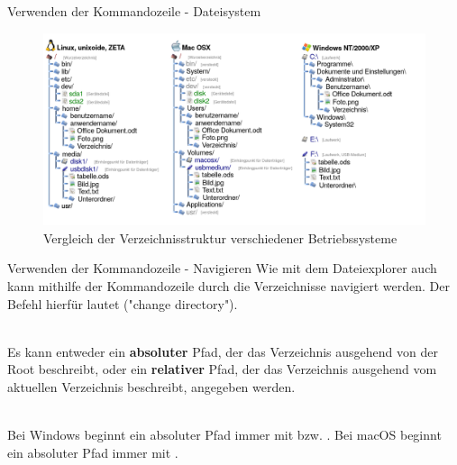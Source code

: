      \begin{frame}{Verwenden der Kommandozeile - Dateisystem}
       
       \begin{figure}
            \centering
            \includegraphics[width=\linewidth,height=0.7\textheight,keepaspectratio]{chapters/05_command_line/figures/Filesystem.png}
            \caption{Vergleich der Verzeichnisstruktur verschiedener Betriebssysteme \cite{filesystems}}
            \label{fig:file_system}
        \end{figure}
    \end{frame}
    
     \begin{frame}{Verwenden der Kommandozeile - Navigieren}
        Wie mit dem Dateiexplorer auch kann mithilfe der Kommandozeile durch die Verzeichnisse navigiert werden. Der Befehl hierfür lautet  ("change directory"). \\~\
        
        Es kann entweder ein \textbf{absoluter} Pfad, der das Verzeichnis ausgehend von der Root beschreibt, oder ein \textbf{relativer} Pfad, der das Verzeichnis ausgehend vom aktuellen Verzeichnis beschreibt, angegeben werden. \\~\
        
        Bei Windows beginnt ein absoluter Pfad immer mit  bzw. \code{\textbackslash{}}. Bei macOS beginnt ein absoluter Pfad immer mit \code{/}.
     \end{frame}
     
